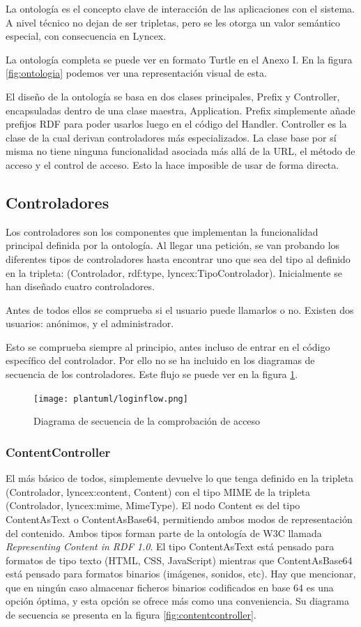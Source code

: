 \documentclass[openright,twoside,12pt]{book}
\begin{document}
La ontología es el concepto clave de interacción de las aplicaciones con el sistema. A nivel técnico no dejan de ser tripletas, pero se les otorga un valor semántico especial, con consecuencia en Lyncex.

La ontología completa se puede ver en formato Turtle en el Anexo I. En la figura \ref{fig:ontologia} podemos ver una representación visual de esta.

El diseño de la ontología se basa en dos clases principales, Prefix y Controller, encapsuladas dentro de una clase maestra, Application. Prefix simplemente añade prefijos RDF para poder usarlos luego en el código del Handler. Controller es la clase de la cual derivan controladores más especializados. La clase base por sí misma no tiene ninguna funcionalidad asociada más allá de la URL, el método de acceso y el control de acceso. Esto la hace imposible de usar de forma directa.

\subsection{Controladores}
Los controladores son los componentes que implementan la funcionalidad principal definida por la ontología.
Al llegar una petición, se van probando los diferentes tipos de controladores hasta encontrar uno que sea del tipo al definido en la tripleta: (Controlador, rdf:type, lyncex:TipoControlador).
Inicialmente se han diseñado cuatro controladores.

Antes de todos ellos se comprueba si el usuario puede llamarlos o no. Existen dos usuarios: anónimos, y el administrador.

Esto se comprueba siempre al principio, antes incluso de entrar en el código específico del controlador. Por ello no se ha incluido en los diagramas de secuencia de los controladores. Este flujo se puede ver en la figura \ref{fig:loginflow}.

\begin{figure}[h]
    \centering
    \texttt{[image: plantuml/loginflow.png]}
    \caption{Diagrama de secuencia de la comprobación de acceso}
    \label{fig:loginflow}
\end{figure}

\subsubsection{ContentController}
El más básico de todos, simplemente devuelve lo que tenga definido en la tripleta (Controlador, lyncex:content, Content) con el tipo MIME 
de la tripleta (Controlador, lyncex:mime, MimeType). El nodo Content es del tipo ContentAsText o ContentAsBase64, permitiendo ambos modos de representación del contenido.
Ambos tipos forman parte de la ontología de W3C llamada \textit{Representing Content in RDF 1.0}\cite{cnt}.
El tipo ContentAsText está pensado para formatos de tipo texto (HTML, CSS, JavaScript) mientras que ContentAsBase64 está pensado para formatos binarios (imágenes, sonidos, etc).
Hay que mencionar, que en ningún caso almacenar ficheros binarios codificados en base 64 es una opción óptima, y esta opción se ofrece más como una conveniencia. Su diagrama de secuencia se presenta en la figura \ref{fig:contentcontroller}.
\end{document}
